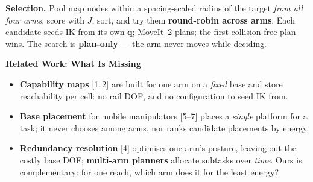 \documentclass[20pt,a4paper]{extarticle}
\newcommand{\pillsize}{25}
\newcommand{\psection}[1]{%
  \begin{sectionpill}\bfseries\fontsize{\pillsize}{\pillsize}\selectfont #1\end{sectionpill}}
\newcommand{\lead}[1]{\textbf{#1}}
\begin{document}
\begin{minipage}[t]{0.487\linewidth}
\vspace{0.5mm}
\lead{Selection.} Pool map nodes within a spacing-scaled radius of the target
\emph{from all four arms}, score with $J$, sort, and try them
\textbf{round-robin across arms}. Each candidate seeds IK from its own
$\mathbf{q}$; MoveIt~2 plans; the first collision-free plan wins. The search is
\textbf{plan-only} --- the arm never moves while deciding.

\psection{Related Work: What Is Missing}

{\fontsize{15}{18}\selectfont
\begin{itemize}[leftmargin=6mm]
  \item \lead{Capability maps} [1,\,2] are built for one arm on a \emph{fixed}
        base and store reachability per cell: no rail DOF, and no configuration
        to seed IK from.
  \item \lead{Base placement} for mobile manipulators [5--7] places a
        \emph{single} platform for a task; it never chooses among arms, nor ranks
        candidate placements by energy.
  \item \lead{Redundancy resolution} [4] optimises one arm's posture, leaving
        out the costly base DOF; \lead{multi-arm planners} allocate subtasks over
        \emph{time}. Ours is complementary: for one reach, which arm does it for
        the least energy?
\end{itemize}}

\end{minipage}\hfill
\end{document}
